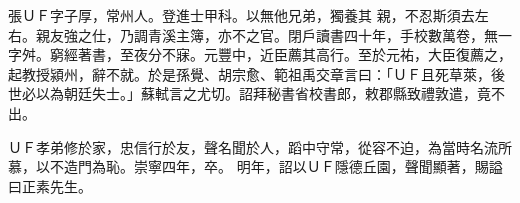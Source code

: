 \begin{pinyinscope}
 張ＵＦ字子厚，常州人。登進士甲科。以無他兄弟，獨養其
 親，不忍斯須去左右。親友強之仕，乃調青溪主簿，亦不之官。閉戶讀書四十年，手校數萬卷，無一字舛。窮經著書，至夜分不寐。元豐中，近臣薦其高行。至於元祐，大臣復薦之，起教授潁州，辭不就。於是孫覺、胡宗愈、範祖禹交章言曰：「ＵＦ且死草萊，後世必以為朝廷失士。」蘇軾言之尤切。詔拜秘書省校書郎，敕郡縣致禮敦遣，竟不出。



 ＵＦ孝弟修於家，忠信行於友，聲名聞於人，蹈中守常，從容不迫，為當時名流所慕，以不造門為恥。崇寧四年，卒。
 明年，詔以ＵＦ隱德丘園，聲聞顯著，賜謚曰正素先生。



\end{pinyinscope}